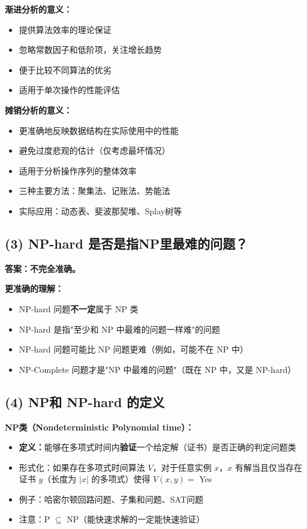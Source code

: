 \documentclass[UTF8,12pt,a4paper]{ctexart}
\begin{document}
\textbf{渐进分析的意义：}
\begin{itemize}
	\item 提供算法效率的理论保证
	\item 忽略常数因子和低阶项，关注增长趋势
	\item 便于比较不同算法的优劣
	\item 适用于单次操作的性能评估
\end{itemize}

\textbf{摊销分析的意义：}
\begin{itemize}
	\item 更准确地反映数据结构在实际使用中的性能
	\item 避免过度悲观的估计（仅考虑最坏情况）
	\item 适用于分析操作序列的整体效率
	\item 三种主要方法：聚集法、记账法、势能法
	\item 实际应用：动态表、斐波那契堆、Splay树等
\end{itemize}

\subsection*{(3) NP-hard 是否是指NP里最难的问题？}

\textbf{答案：不完全准确。}

\textbf{更准确的理解：}
\begin{itemize}
	\item NP-hard 问题\textbf{不一定}属于 NP 类
	\item NP-hard 是指"至少和 NP 中最难的问题一样难"的问题
	\item NP-hard 问题可能比 NP 问题更难（例如，可能不在 NP 中）
	\item NP-Complete 问题才是"NP 中最难的问题"（既在 NP 中，又是 NP-hard）
\end{itemize}

\subsection*{(4) NP和 NP-hard 的定义}

\textbf{NP类（Nondeterministic Polynomial time）：}
\begin{itemize}
	\item \textbf{定义：}能够在多项式时间内\textbf{验证}一个给定解（证书）是否正确的判定问题类
	\item 形式化：如果存在多项式时间算法 $V$，对于任意实例 $x$，$x$ 有解当且仅当存在证书 $y$（长度为 $|x|$ 的多项式）使得 $V(x, y) = $ Yes
	\item 例子：哈密尔顿回路问题、子集和问题、SAT问题
	\item 注意：P $\subseteq$ NP（能快速求解的一定能快速验证）
\end{itemize}
\end{document}
